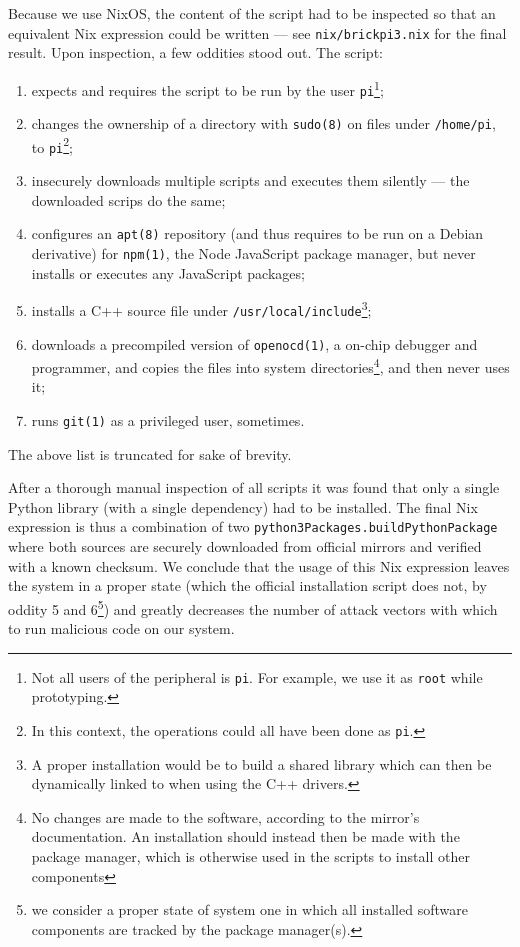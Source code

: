 Because we use NixOS, the content of the script had to be inspected so that an equivalent Nix expression could be written ---
see \texttt{nix/brickpi3.nix} for the final result.
Upon inspection, a few oddities stood out. The script:
\begin{enumerate}
\item expects and requires the script to be run by the user \texttt{pi}\footnote{Not all users of the peripheral is \texttt{pi}. For example, we use it as \texttt{root} while prototyping.};
\item changes the ownership of a directory with \texttt{sudo(8)} on files under \texttt{/home/pi}, to \texttt{pi}\footnote{In this context, the operations could all have been done as \texttt{pi}.};
\item insecurely downloads multiple scripts and executes them silently --- the downloaded scrips do the same;
\item configures an \texttt{apt(8)} repository (and thus requires to be run on a Debian derivative) for \texttt{npm(1)},
  the Node JavaScript package manager, but never installs or executes any JavaScript packages;
\item installs a C++ source file under \texttt{/usr/local/include}\footnote{A proper installation would be to build a shared library which can then be dynamically linked to when using the C++ drivers.};
\item downloads a precompiled version of \texttt{openocd(1)}, a on-chip debugger and programmer,
  and copies the files into system directories\footnote{No changes are made to the software, according to the mirror's documentation. An installation should instead then be made with the package manager, which is otherwise used in the scripts to install other components}, and then never uses it;
\item runs \texttt{git(1)} as a privileged user, sometimes.
\end{enumerate}
The above list is truncated for sake of brevity.

After a thorough manual inspection of all scripts it was found that only a single Python library (with a single dependency) had to be installed.
The final Nix expression is thus a combination of two \texttt{python3Packages.buildPythonPackage} where both sources are securely downloaded from official mirrors and verified with a known checksum.
We conclude that the usage of this Nix expression leaves the system in a proper state (which the official installation script does not, by oddity 5 and 6\footnote{we consider a proper state of system one in which all installed software components are tracked by the package manager(s).}) and greatly decreases the number of attack vectors with which to run malicious code on our system.

